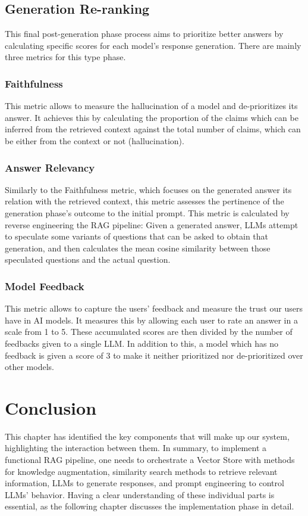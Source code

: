 \subsection{Generation Re-ranking}
This final post-generation phase process aims to prioritize better answers by calculating specific scores for each model's response generation. There are mainly three metrics for this type phase.
\subsubsection{Faithfulness}
This metric allows to measure the hallucination of a model and de-prioritizes its answer. It achieves this by calculating the proportion of the claims which can be inferred from the retrieved context against the total number of claims, which can be either from the context or not (hallucination).
\subsubsection{Answer Relevancy}
Similarly to the Faithfulness metric, which focuses on the generated answer its relation with the retrieved context, this metric assesses the pertinence of the generation phase's outcome to the initial prompt. This metric is calculated by reverse engineering the RAG pipeline: Given a generated answer, LLMs attempt to speculate some variants of questions that can be asked to obtain that generation, and then calculates the mean cosine similarity between those speculated questions and the actual question.
\subsubsection{Model Feedback}
This metric allows to capture the users' feedback and measure the trust our users have in AI models. It measures this by allowing each user to rate an answer in a scale from 1 to 5. These accumulated scores are then divided by the number of feedbacks given to a single LLM. In addition to this, a model which has no feedback is given a score of 3 to make it neither prioritized nor de-prioritized  over other models.

\section{Conclusion}
This chapter has identified the key components that will make up our system, highlighting the interaction between them. In summary, to implement a functional RAG pipeline, one needs to orchestrate a Vector Store with methods for knowledge augmentation, similarity search methods to retrieve relevant information, LLMs to generate responses, and prompt engineering to control LLMs' behavior.\newline
Having a clear understanding of these individual parts is essential, as the following chapter discusses the implementation phase in detail.